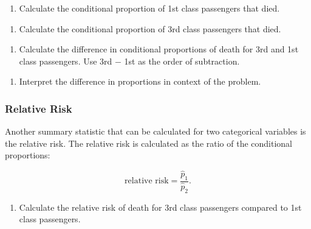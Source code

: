 \documentclass[
]{report}
\providecommand{\tightlist}{%
  \setlength{\itemsep}{0pt}\setlength{\parskip}{0pt}}
\begin{document}
\begin{enumerate}
\def\labelenumi{\arabic{enumi}.}
\setcounter{enumi}{5}
\tightlist
\item
  Calculate the conditional proportion of 1st class passengers that died.
\end{enumerate}

\vspace{0.8in}

\begin{enumerate}
\def\labelenumi{\arabic{enumi}.}
\setcounter{enumi}{6}
\tightlist
\item
  Calculate the conditional proportion of 3rd class passengers that died.
\end{enumerate}

\vspace{0.8in}

\begin{enumerate}
\def\labelenumi{\arabic{enumi}.}
\setcounter{enumi}{7}
\tightlist
\item
  Calculate the difference in conditional proportions of death for 3rd and 1st class passengers. Use 3rd \(-\) 1st as the order of subtraction.
\end{enumerate}

\vspace{0.8in}

\begin{enumerate}
\def\labelenumi{\arabic{enumi}.}
\setcounter{enumi}{8}
\tightlist
\item
  Interpret the difference in proportions in context of the problem.
\end{enumerate}

\vspace{0.8in}

\hypertarget{relative-risk}{%
\subsubsection*{Relative Risk}\label{relative-risk}}

Another summary statistic that can be calculated for two categorical variables is the relative risk. The relative risk is calculated as the ratio of the conditional proportions:

\[\text{relative risk} = \frac{\hat{p}_1}{\hat{p}_2}.\]

\begin{enumerate}
\def\labelenumi{\arabic{enumi}.}
\setcounter{enumi}{9}
\tightlist
\item
  Calculate the relative risk of death for 3rd class passengers compared to 1st class passengers.
\end{enumerate}
\end{document}
